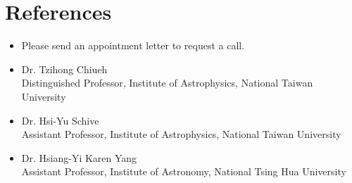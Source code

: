 \documentclass[%
               doublesided,
               paper=a4,
               fontsize=10pt
              ]{resume}
\begin{document}
\section{References}
\begin{itemize}
  \item Please send an appointment letter to request a call. 
  \item Dr. Tzihong Chiueh\\
        Distinguished Professor, Institute of Astrophysics, National Taiwan University\\
  \item Dr. Hsi-Yu Schive\\
        Assistant Professor, Institute of Astrophysics, National Taiwan University\\
  \item Dr. Hsiang-Yi Karen Yang\\
        Assistant Professor, Institute of Astronomy, National Tsing Hua University\\
\end{itemize}
\end{document}

